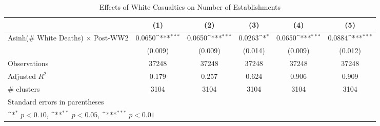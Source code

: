 \begin{table}[htbp]\centering
\def\sym#1{\ifmmode^{#1}\else\(^{#1}\)\fi}
\caption{Effects of White Casualties on Number of Establishments}
\begin{tabular}{l*{5}{c}}
\hline\hline
                    &\multicolumn{1}{c}{(1)}         &\multicolumn{1}{c}{(2)}         &\multicolumn{1}{c}{(3)}         &\multicolumn{1}{c}{(4)}         &\multicolumn{1}{c}{(5)}         \\
\hline
Asinh(\# White Deaths) $\times$ Post-WW2&      0.0650\sym{***}&      0.0650\sym{***}&      0.0263\sym{*}  &      0.0650\sym{***}&      0.0884\sym{***}\\
                    &     (0.009)         &     (0.009)         &     (0.014)         &     (0.009)         &     (0.012)         \\
\hline
Observations        &       37248         &       37248         &       37248         &       37248         &       37248         \\
Adjusted \(R^{2}\)  &       0.179         &       0.257         &       0.624         &       0.906         &       0.909         \\
\# clusters         &        3104         &        3104         &        3104         &        3104         &        3104         \\
\hline\hline
\multicolumn{6}{l}{\footnotesize Standard errors in parentheses}\\
\multicolumn{6}{l}{\footnotesize \sym{*} \(p<0.10\), \sym{**} \(p<0.05\), \sym{***} \(p<0.01\)}\\
\end{tabular}
\end{table}
